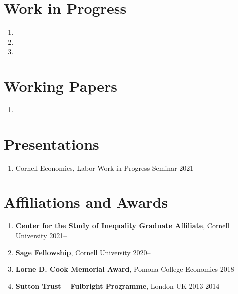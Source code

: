 \documentclass[letterpaper,11pt,oneside]{article}
\begin{document}
\newpage
\onehalfspacing
\restoregeometry
{}

\section*{Work in Progress}
\begin{enumerate}[itemsep=2.5pt, label={}]
    \item {}
    \item {}
    \item {}
\end{enumerate}


\section*{Working Papers}
\begin{enumerate}[itemsep=2.5pt, label={}]
    \item {}
\end{enumerate}


 
\section*{Presentations}
\begin{enumerate}[noitemsep, label={}]
    \item Cornell Economics, Labor Work in Progress Seminar 2021--
\end{enumerate}

\section*{Affiliations and Awards}
\begin{enumerate}[itemsep=2pt, label={}]
    \item \textbf{Center for the Study of Inequality Graduate Affiliate}, Cornell University 2021--
    \item \textbf{Sage Fellowship}, Cornell University 2020--
    \item \textbf{Lorne D. Cook Memorial Award}, Pomona College Economics 2018
    \item \textbf{Sutton Trust -- Fulbright Programme}, London UK 2013-2014  
\end{enumerate}
\end{document}
